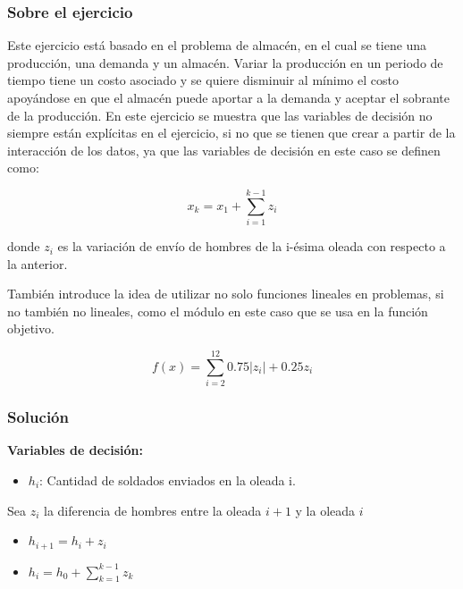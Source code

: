 \documentclass[a4paper,10pt,twocolumn]{article}
\theoremstyle{theorem}
\theoremstyle{definition}
\theoremstyle{remark}
\begin{document}
		\subsubsection{Sobre el ejercicio}\label{subsubsec:sobre_ejer_5}

Este ejercicio está basado en el problema de almacén, en el cual se tiene una producción, una demanda y un almacén. Variar la producción en un periodo de tiempo tiene un costo asociado y se quiere disminuir al mínimo el costo apoyándose en que el almacén puede aportar a la demanda y aceptar el sobrante de la producción. En este ejercicio se muestra que las variables de decisión no siempre están explícitas en el ejercicio, si no que se tienen que crear a partir de la interacción de los datos, ya que las variables de decisión en este caso se definen como:

$$
x_k = x_1 + \sum_{i=1}^{k-1}z_i
$$

donde $z_i$ es la variación de envío de hombres de la i-ésima oleada con respecto a la anterior.

También introduce la idea de utilizar no solo funciones lineales en problemas, si no también no lineales, como el módulo en este caso que se usa en la función objetivo.

$$
f(x) = \sum_{i=2}^{12} 0.75 |z_i| + 0.25 z_i
$$

		\subsubsection{Solución}\label{subsubsec:sol_ejer_5}

\textbf{Variables de decisión:}

\begin{itemize}
	\item $h_i$: Cantidad de soldados enviados en la oleada i.
\end{itemize}

Sea $z_i$ la diferencia de hombres entre la oleada $i+1$ y la oleada $i$

\begin{itemize}

	\item $h_{i+1} = h_i + z_i$
	\item $h_{i} = h_0 + \sum_{k=1}^{k-1} z_k$
	
\end{itemize}
\end{document}
